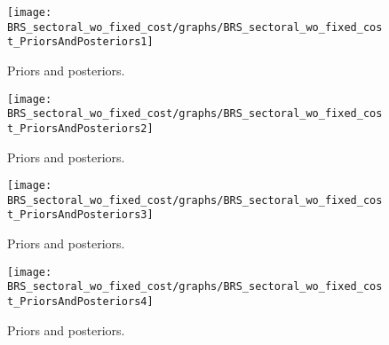  
\begin{figure}[H]
\centering
\texttt{[image: BRS\_sectoral\_wo\_fixed\_cost/graphs/BRS\_sectoral\_wo\_fixed\_cost\_PriorsAndPosteriors1]}
\caption{Priors and posteriors.}\label{Fig:PriorsAndPosteriors:1}
\end{figure}
 
\begin{figure}[H]
\centering
\texttt{[image: BRS\_sectoral\_wo\_fixed\_cost/graphs/BRS\_sectoral\_wo\_fixed\_cost\_PriorsAndPosteriors2]}
\caption{Priors and posteriors.}\label{Fig:PriorsAndPosteriors:2}
\end{figure}
 
\begin{figure}[H]
\centering
\texttt{[image: BRS\_sectoral\_wo\_fixed\_cost/graphs/BRS\_sectoral\_wo\_fixed\_cost\_PriorsAndPosteriors3]}
\caption{Priors and posteriors.}\label{Fig:PriorsAndPosteriors:3}
\end{figure}
 
\begin{figure}[H]
\centering
\texttt{[image: BRS\_sectoral\_wo\_fixed\_cost/graphs/BRS\_sectoral\_wo\_fixed\_cost\_PriorsAndPosteriors4]}
\caption{Priors and posteriors.}\label{Fig:PriorsAndPosteriors:4}
\end{figure}
 
